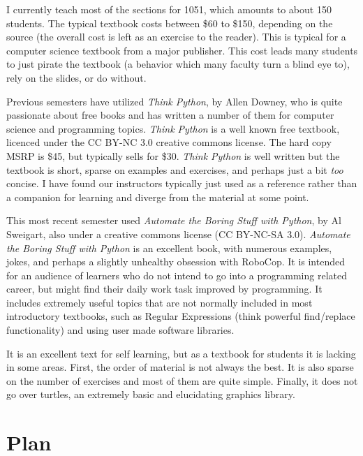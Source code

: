 \documentclass[]{article}
\begin{document}
I currently teach most of the sections for 1051, which amounts to about 150 students.  
The typical textbook costs between \$60 to \$150, depending on the source (the overall cost is left as an exercise to the reader).
This is typical for a computer science textbook from a major publisher.
This cost leads many students to just pirate the textbook (a behavior which many faculty turn a blind eye to), rely on the slides, or do without.

Previous semesters have utilized \textit{Think Python}, by Allen Downey, who is quite passionate about free books and has written a number of them for computer science and programming topics.
\textit{Think Python} is a well known free textbook, licenced under the CC BY-NC 3.0 creative commons license.  The hard copy MSRP is  \$45, but typically sells for \$30.
\textit{Think Python} is well written but the textbook is short, sparse on examples and exercises, and perhaps just a bit \textit{too} concise.
I have found our instructors typically just used as a reference rather than a companion for learning and diverge from the material at some point.

This most recent semester used \textit{Automate the Boring Stuff with Python}, by Al Sweigart, also under a creative commons license (CC BY-NC-SA 3.0).
\textit{Automate the Boring Stuff with Python} is an excellent book, with numerous examples, jokes, and perhaps a slightly unhealthy obsession with RoboCop.
It is intended for an audience of learners who do not intend to go into a programming related career, but might find their daily work task improved by programming.
It includes extremely useful topics that are not normally included in most introductory textbooks, such as Regular Expressions (think powerful find/replace functionality) and using user made software libraries.

It is an excellent text for self learning, but as a textbook for students it is lacking in some areas.  
First, the order of material is not always the best.
It is also sparse on the number of exercises and most of them are quite simple. 
Finally, it does not go over turtles, an extremely basic and elucidating graphics library.


\section{Plan}
\end{document}
